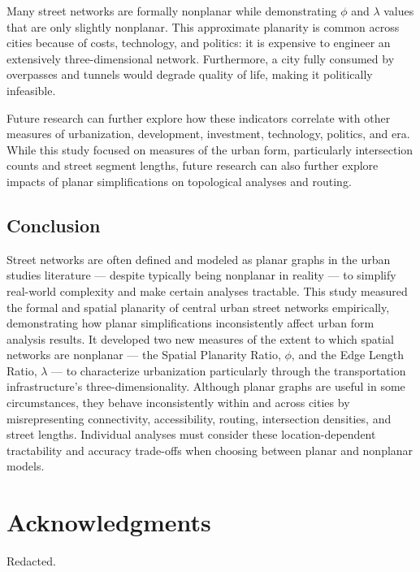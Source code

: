 \documentclass[Afour,sageh,times]{sagej}
\begin{document}
Many street networks are formally nonplanar while demonstrating $\phi$ and $\lambda$ values that are only slightly nonplanar. This approximate planarity is common across cities because of costs, technology, and politics: it is expensive to engineer an extensively three-dimensional network. Furthermore, a city fully consumed by overpasses and tunnels would degrade quality of life, making it politically infeasible.

Future research can further explore how these indicators correlate with other measures of urbanization, development, investment, technology, politics, and era. While this study focused on measures of the urban form, particularly intersection counts and street segment lengths, future research can also further explore impacts of planar simplifications on topological analyses and routing.

\subsection{Conclusion}

Street networks are often defined and modeled as planar graphs in the urban studies literature --- despite typically being nonplanar in reality --- to simplify real-world complexity and make certain analyses tractable. This study measured the formal and spatial planarity of central urban street networks empirically, demonstrating how planar simplifications inconsistently affect urban form analysis results. It developed two new measures of the extent to which spatial networks are nonplanar --- the Spatial Planarity Ratio, $\phi$, and the Edge Length Ratio, $\lambda$ ---  to characterize urbanization particularly through the transportation infrastructure's three-dimensionality. Although planar graphs are useful in some circumstances, they behave inconsistently within and across cities by misrepresenting connectivity, accessibility, routing, intersection densities, and street lengths. Individual analyses must consider these location-dependent tractability and accuracy trade-offs when choosing between planar and nonplanar models.



\section{Acknowledgments}

Redacted.





\end{document}
